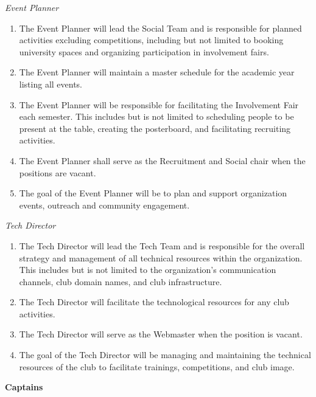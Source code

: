\documentclass[12pt]{article}
\begin{document}
\textit{Event Planner}
\begin{enumerate}
  \item The Event Planner will lead the Social Team and is responsible for planned activities excluding competitions, including but not limited to booking university spaces and organizing participation in involvement fairs.
  \item The Event Planner will maintain a master schedule for the academic year listing all events.
  \item The Event Planner will be responsible for facilitating the Involvement Fair each semester. This includes but is not limited to scheduling people to be present at the table, creating the posterboard, and facilitating recruiting activities.
  \item The Event Planner shall serve as the Recruitment and Social chair when the positions are vacant.
  \item The goal of the Event Planner will be to plan and support organization events, outreach and community engagement.
\end{enumerate}

\textit{Tech Director}
\begin{enumerate}
  \item The Tech Director will lead the Tech Team and is responsible for the overall strategy and management of all technical resources within the organization. This includes but is not limited to the organization's communication channels, club domain names, and club infrastructure.
  \item The Tech Director will facilitate the technological resources for any club activities.
  \item The Tech Director will serve as the Webmaster when the position is vacant.
  \item The goal of the Tech Director will be managing and maintaining the technical resources of the club to facilitate trainings, competitions, and club image.
\end{enumerate}

\textbf{Captains}
\end{document}
